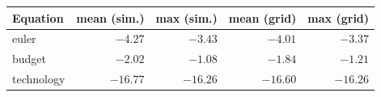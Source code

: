 \begin{tabular}{lrrrr}
\toprule
Equation & mean (sim.) & max (sim.) & mean (grid) & max (grid) \\
\midrule
euler & $-4.27$ & $-3.43$ & $-4.01$ & $-3.37$ \\
budget & $-2.02$ & $-1.08$ & $-1.84$ & $-1.21$ \\
technology & $-16.77$ & $-16.26$ & $-16.60$ & $-16.26$ \\
\bottomrule
\end{tabular}

